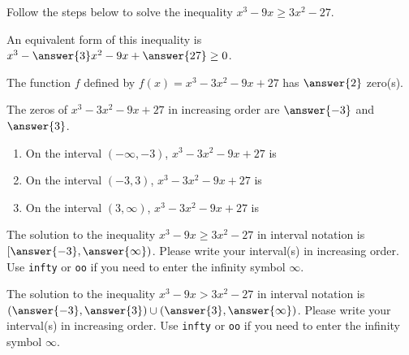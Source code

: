 \documentclass{ximera}
\author{Kenneth Berglund}
\begin{document}
Follow the steps below to solve the inequality $x^3 - 9x \ge 3x^2 - 27$.
\begin{exercise}
An equivalent form of this inequality is $x^3 - \answer{3}x^2 - 9x + \answer{27} \ge 0$. 

\begin{exercise}
The function $f$ defined by $f(x) = x^3 - 3x^2 - 9x + 27$ has $\answer{2}$ zero(s).

\begin{exercise}
The zeros of $x^3 - 3x^2 - 9x + 27$ in increasing order are $\answer{-3}$ and $\answer{3}$.

\begin{exercise}
\begin{enumerate}
\item On the interval $\left(-\infty, -3\right)$, $x^3 - 3x^2 - 9x + 27$ is 
\begin{multipleChoice}  
\end{multipleChoice} 

\item On the interval $\left(-3, 3\right)$, $x^3 - 3x^2 - 9x + 27$ is 
\begin{multipleChoice}  
\end{multipleChoice} 

\item On the interval $\left(3, \infty\right)$, $x^3 - 3x^2 - 9x + 27$ is 
\begin{multipleChoice}  
\end{multipleChoice} 


\end{enumerate}

\begin{exercise}
The solution to the inequality $x^3 - 9x \ge 3x^2 - 27$ in interval notation is $\left[\answer{-3}, \answer{\infty}\right)$. Please write your interval(s) in increasing order. Use \verb+infty+ or \verb+oo+ if you need to enter the infinity symbol $\infty$.
\end{exercise}

\begin{exercise}
The solution to the inequality $x^3 - 9x > 3x^2 - 27$ in interval notation is $\left(\answer{-3}, \answer{3}\right) \cup (\answer{3}, \answer{\infty})$. Please write your interval(s) in increasing order. Use \verb+infty+ or \verb+oo+ if you need to enter the infinity symbol $\infty$.
\end{exercise}

\end{exercise}
\end{exercise}
\end{exercise}

\end{exercise}
\end{document}
